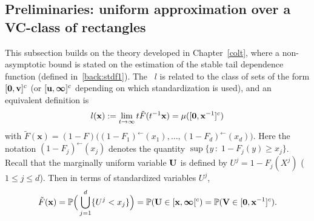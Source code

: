 \subsection{Preliminaries: uniform approximation over a VC-class of rectangles}
\label{jmva:sec:rectangles}
This subsection builds on the theory developed in Chapter~\ref{colt}, where a non-asymptotic bound is stated on the estimation of the stable tail dependence function (defined in~\eqref{back:stdf1}). %
The \stdf~$l$ is related to the class of sets of the form $[\mathbf 0, \mathbf v]^c$ (or $[\mathbf u, \boldsymbol{\infty}]^c$ depending on which standardization is used), and an equivalent definition is 
\begin{align}
\label{jmva:stdf}
l(\mathbf{x}):= \lim_{t \to \infty} t \tilde F (t^{-1}\mathbf{x}) = \mu([\mathbf 0, \mathbf x ^{-1}]^c) 
\end{align}
\noindent
with $\tilde F (\mathbf{x}) = (1-F) \big( (1-F_1)^\leftarrow(x_1),\ldots, (1-F_d)^\leftarrow(x_d)  \big)$.
 Here the notation
$(1-F_j)^\leftarrow(x_j)$ denotes the quantity $\sup\{y\,:\; 1-F_j(y) \ge x_j\}$. Recall that the marginally uniform variable $\mathbf U$ is defined by  $U^j = 1-F_j(X^j)$ ($1\le j\le d$). Then  in terms of standardized variables $U^j$, 
\begin{align}
\label{jmva:def:tildeF}
\tilde F(\mathbf x) = \mathbb{P}\Big(\bigcup_{j=1}^d\{U^j< x_j\}\Big) = \mathbb{P}(\mathbf
U\in [\mathbf x, \boldsymbol{\infty}[^c) = \mathbb{P}(\mathbf V \in [\mathbf 0, \mathbf x^{-1}]^c). 
\end{align}

